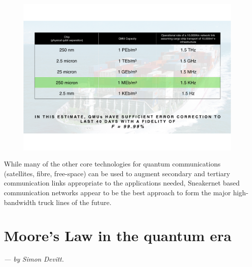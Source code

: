 \documentclass[twocolumn, aps, rmp, amsmath, amssymb, nofootinbib, superscriptaddress, longbibliography, floatfix, table-of-contents, eqsecnum]{revtex4-2}
\newcommand{\sectionby}[1]{\begin{center}\textit{--- by #1.}\end{center}}
\newcommand{\comment}[1]{{\color{blue}{\textbf{#1}}}}
\begin{document}
\begin{figure}[htbp!]
	\includegraphics[clip=true, width=\columnwidth]{link}
	\caption{} \label{fig:link}
\end{figure}

While many of the other core technologies for quantum communications (satellites, fibre, free-space) can be used to augment secondary and tertiary communication links appropriate to the applications needed, Sneakernet based communication networks appear to be the best approach to form the major high-bandwidth truck lines of the future. 

\section{Moore's Law in the quantum era}

\sectionby{Simon Devitt}

\comment{To do}



\printindex
\end{document}
